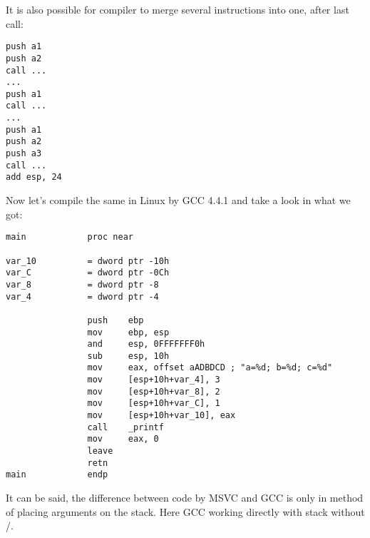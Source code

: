 {It is also possible for compiler to merge several  instructions into one, after last call:}

\begin{lstlisting}
push a1
push a2
call ...
...
push a1
call ...
...
push a1
push a2
push a3
call ...
add esp, 24
\end{lstlisting}

{Now let's compile the same in Linux by GCC 4.4.1 and take a look in \IDA what we got:}

\begin{lstlisting}
main            proc near

var_10          = dword ptr -10h
var_C           = dword ptr -0Ch
var_8           = dword ptr -8
var_4           = dword ptr -4

                push    ebp
                mov     ebp, esp
                and     esp, 0FFFFFFF0h
                sub     esp, 10h
                mov     eax, offset aADBDCD ; "a=%d; b=%d; c=%d"
                mov     [esp+10h+var_4], 3
                mov     [esp+10h+var_8], 2
                mov     [esp+10h+var_C], 1
                mov     [esp+10h+var_10], eax
                call    _printf
                mov     eax, 0
                leave
                retn
main            endp
\end{lstlisting}

{It can be said, the difference between code by MSVC and GCC is only in method of placing arguments on the stack.
Here GCC working directly with stack without \PUSH/\POP.}
